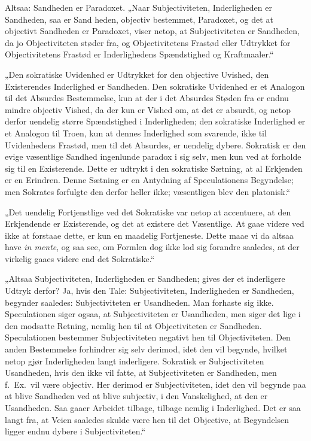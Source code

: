 Altsaa: Sandheden er Paradoxet. „Naar Subjectiviteten,
Inderligheden er Sandheden, saa er Sand%
heden, objectiv bestemmet, Paradoxet, og det at objectivt
Sandheden er Paradoxet, viser netop, at Subjectiviteten er
Sandheden, da jo Objectiviteten støder fra, og Objectivitetens
Frastød eller Udtrykket for Objectivitetens Frastød er
Inderlighedens Spændstighed og Kraftmaaler.“

„Den sokratiske Uvidenhed er Udtrykket for den objective Uvished,
den Existerendes Inderlighed er Sandheden. Den sokratiske
Uvidenhed er et Analogon til det Absurdes Bestemmelse, kun at der
i det Absurdes Støden fra er endnu mindre objectiv Vished, da der
kun er Vished om, at det er absurdt, og netop derfor uendelig
større Spændstighed i Inderligheden; den sokratiske Inderlighed er
et Analogon til Troen, kun at dennes Inderlighed som svarende,
ikke til Uvidenhedens Frastød, men til det Absurdes, er uendelig
dybere. Sokratisk er den evige væsentlige Sandhed ingenlunde
paradox%
{} i sig selv, men kun ved at forholde sig til en Existerende.
Dette er udtrykt i den sokratiske Sætning, at al Erkjenden er en
Erindren. Denne Sætning er en Antydning af Speculationens
Begyndelse; men Sokrates forfulgte den derfor heller ikke;
væsentligen blev den platonisk.“

„Det uendelig Fortjenstlige ved det Sokratiske var netop at
accentuere, at den Erkjendende er Existerende, og det at existere
det Væsentlige. At gaae videre ved ikke at forstaae dette, er kun
en maadelig Fortjeneste. Dette maae vi da altsaa have
\textit{in mente}, og saa see, om Formlen dog ikke lod sig
forandre saaledes, at der virkelig gaaes videre end det
Sokratiske.“

 „Altsaa Subjectiviteten, Inderligheden er Sandheden; gives der et
inderligere Udtryk derfor? Ja, hvis den Tale: Subjectiviteten,
Inderligheden er Sandheden, begynder saaledes: Subjectiviteten er
Usandheden. Man forhaste sig ikke. Speculationen siger ogsaa, at
Subjectiviteten er Usandheden, men siger det lige i den modsatte
Retning, nemlig hen til at Objectiviteten er Sandheden.
Speculationen bestemmer Subjectiviteten negativt hen til
Objectiviteten. Den anden Bestemmelse forhindrer sig selv derimod,
idet den vil begynde, hvilket netop gjør Inderligheden langt
inderligere. Sokratisk er Subjectiviteten Usandheden, hvis den
ikke vil fatte, at Subjectiviteten er Sandheden, men f.\ Ex.\ vil
være objectiv. Her derimod er Subjectiviteten, idet den vil
begynde paa at blive Sandheden ved at blive subjectiv, i den
Vanskelighed, at den er Usandheden. Saa gaaer Arbeidet tilbage,
tilbage nemlig i Inderlighed. Det er saa langt fra, at Veien
saaledes skulde være hen til det Objective, at Begyndelsen ligger
endnu dybere i Subjectiviteten.“

